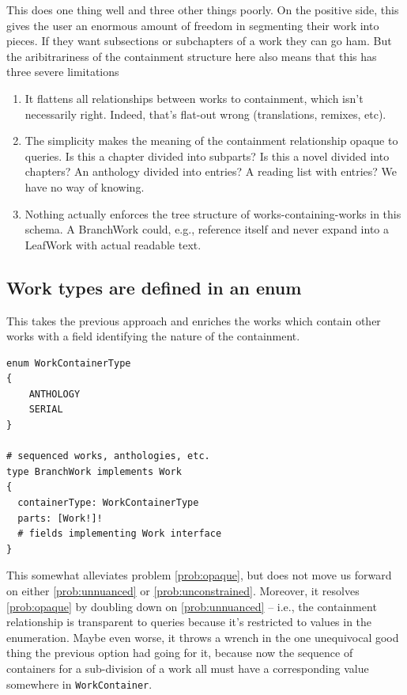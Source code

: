 \documentclass{amsart}
\theoremstyle{remark}
\begin{document}
This does one thing well and three other things poorly. On the positive side, this gives the user an enormous amount of freedom in segmenting their work into pieces. If they want subsections or subchapters of a work they can go ham. But the aribitrariness of the containment structure here also means that this has three severe limitations
\begin{enumerate}
  \item \label{prob:unnuanced} It flattens all relationships between works to containment, which isn't necessarily right. Indeed, that's flat-out wrong (translations, remixes, etc).
  \item \label{prob:opaque} The simplicity makes the meaning of the containment relationship opaque to queries. Is this a chapter divided into subparts? Is this a novel divided into chapters? An anthology divided into entries? A reading list with entries? We have no way of knowing.
  \item \label{prob:unconstrained} Nothing actually enforces the tree structure of works-containing-works in this schema. A BranchWork could, e.g., reference itself and never expand into a LeafWork with actual readable text.
\end{enumerate}

\subsection{Work types are defined in an enum}
This takes the previous approach and enriches the works which contain other works with a field identifying the nature of the containment.
\begin{lstlisting}[frame=single,basicstyle=\small]
enum WorkContainerType
{
    ANTHOLOGY
    SERIAL
}

# sequenced works, anthologies, etc.
type BranchWork implements Work
{
  containerType: WorkContainerType
  parts: [Work!]!   
  # fields implementing Work interface
}
\end{lstlisting}
This somewhat alleviates problem \ref{prob:opaque}, but does not move us forward on either \ref{prob:unnuanced} or \ref{prob:unconstrained}. Moreover, it resolves \ref{prob:opaque} by doubling down on \ref{prob:unnuanced} -- i.e., the containment relationship is transparent to queries because it's restricted to values in the enumeration. Maybe even worse, it throws a wrench in the one unequivocal good thing the previous option had going for it, because now the sequence of containers for a sub-division of a work all must have a corresponding value somewhere in \lstinline|WorkContainer|. 
\end{document}
